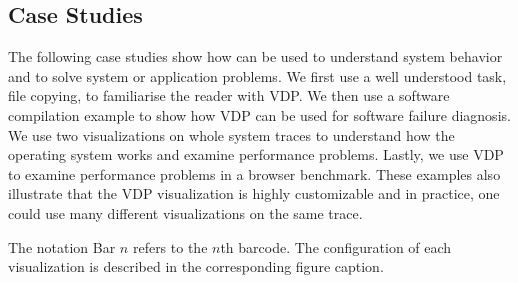 \subsection{Case Studies}
\label{sec:lviz-study}

The following case studies show how  can be used to
understand system behavior and to solve system or application problems.
We first use a well understood task, file copying,
to familiarise the reader with VDP.
We then use a software compilation example to show how VDP can
be used for software failure diagnosis.
We use two visualizations on whole system traces to understand
how the operating system works and examine performance problems.
Lastly, we use VDP to examine performance problems in a browser benchmark.
These examples also illustrate that the VDP visualization is highly
customizable and in practice, one could use many different visualizations
on the same trace.


The notation Bar $n$ refers to the $n$th barcode.
The configuration of each visualization is described in the corresponding
figure caption.





%

%
%
